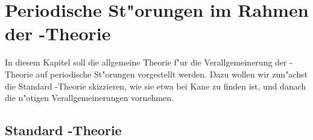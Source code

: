 
\chapter{Periodische St"orungen im Rahmen der \kdotp-Theorie}
\label{cha:period-stoer}

In diesem Kapitel soll die allgemeine Theorie f"ur die Verallgemeinerung der
\kdotp-Theorie auf periodische St"orungen vorgestellt werden. Dazu wollen wir
zun"achst die Standard \kdotp-Theorie skizzieren, wie sie etwa bei Kane
\cite{kane:66} zu finden ist, und danach die n"otigen Verallgemeinerungen
vornehmen. 

\section{Standard \kdotp-Theorie}
\label{sec:standard-k.p}

